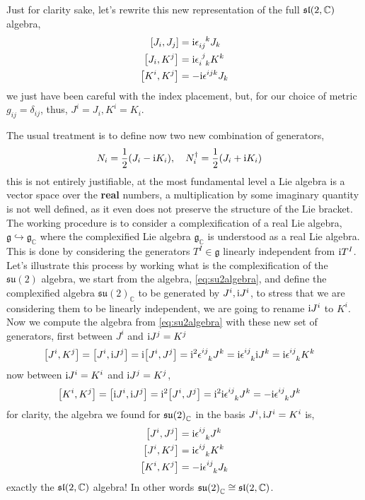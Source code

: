Just for clarity sake, let's rewrite this new representation of the full $\mathfrak {sl}\qty(2,\mathbb C)$ algebra,
\begin{align} 
    \comm{J_i}{J_j}&=\im\tensor{\epsilon}{_i_j^k}J_k\\
    \comm{J_i}{K^j}&=\im\tensor{\epsilon}{_i^j_k}K^k\\
    \comm{K^i}{K^j}&=-\im\epsilon^{ijk}J_{k}
\end{align}
we just have been careful with the index placement, but, for our choice of metric $g_{ij}=\delta_{ij}$, thus, $J^i = J_i, K^i = K_i$.

The usual treatment is to define now two new combination of generators,
\begin{align}
    N_i&=\frac12\qty(J_i-\im K_i),\ \ \ N^\dagger_i=\frac12\qty(J_i+\im K_i)\label{eq:noperators}
\end{align}
this is not entirely justifiable, at the most fundamental level a Lie algebra is a vector space over the \textbf{real} numbers, a multiplication by some imaginary quantity is 
not well defined, as it even does not preserve the structure of the Lie bracket. The working procedure is to consider a complexification of a real Lie algebra, 
$\mathfrak g\hookrightarrow \mathfrak g_{\mathbb C}$ where the complexified Lie algebra $\mathfrak g_{\mathbb C}$ is understood as a real Lie algebra. This is 
done by considering the generators $T^I\in\mathfrak g$ linearly independent from $\textnormal{i} T^I$. Let's illustrate this process by working what is the complexification of 
the $\mathfrak {su}(2)$ algebra, we start from the algebra, \cref{eq:su2algebra}, and define the complexified algebra $\mathfrak {su}(2)_{\mathbb C}$ to be generated by 
$J^i, \textnormal{i} J^i$, to stress that we are considering them to be linearly independent, we are going to rename $\textnormal{i} J^i$ to $K^i$. Now we compute the algebra from \cref{eq:su2algebra} 
with these new set of generators, first between $J^i$ and $\textnormal{i} J^j = K^j$
\begin{align}
    \comm{J^i}{K^j}&=\comm{J^i}{\im J^j} = \im\comm{J^i}{J^j} =\im^2\tensor{\epsilon}{^i^j_k}J ^k = \im\tensor{\epsilon}{^i^j_k}\im J ^k= \im\tensor{\epsilon}{^i^j_k}K ^k 
\end{align}
now between $\textnormal{i} J^i = K^i$ and $\textnormal{i} J^j = K^j$,
\begin{align}
    \comm{K^i}{K^j}&=\comm{\im J^i}{\im J^j} = \im^2\comm{J^i}{J^j} =\im^2\im\tensor{\epsilon}{^i^j_k}J ^k = -\im\tensor{\epsilon}{^i^j_k} J ^k
\end{align}
for clarity, the algebra we found for $\mathfrak {su}\qty(2)_{\mathbb C}$ in the basis $J^i, \textnormal{i} J^i= K^i$ is,
\begin{align} 
    \comm{J^i}{J^j}&=\im\tensor{\epsilon}{^i^j_k}J^k\\
    \comm{J^i}{K^j}&=\im\tensor{\epsilon}{^i^j_k}K^k\\
    \comm{K^i}{K^j}&=-\im\tensor{\epsilon}{^i^j_k}J_{k}
\end{align}
exactly the $\mathfrak{sl}\qty(2,\mathbb C)$ algebra! In other words $\mathfrak {su}\qty(2)_{\mathbb C}\cong \mathfrak{sl}\qty(2,\mathbb C)$.

